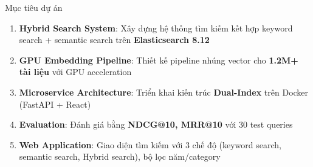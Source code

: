\begin{frame}{Mục tiêu dự án}
\begin{enumerate}
    \item \textcolor{accentTeal}{\textbf{Hybrid Search System}}: Xây dựng hệ thống tìm kiếm kết hợp keyword search + semantic search trên \textbf{Elasticsearch 8.12}

    \vspace{0.15cm}
    \item \textcolor{accentBlue}{\textbf{GPU Embedding Pipeline}}: Thiết kế pipeline nhúng vector cho \textbf{1.2M+ tài liệu} với GPU acceleration

    \vspace{0.15cm}
    \item \textcolor{accentOrange}{\textbf{Microservice Architecture}}: Triển khai kiến trúc \textbf{Dual-Index} trên Docker (FastAPI + React)

    \vspace{0.15cm}
    \item \textcolor{accentPurple}{\textbf{Evaluation}}: Đánh giá bằng \textbf{NDCG@10, MRR@10} với 30 test queries

    \vspace{0.15cm}
    \item \textcolor{accentTeal}{\textbf{Web Application}}: Giao diện tìm kiếm với 3 chế độ (keyword search, semantic search, Hybrid search), bộ lọc năm/category
\end{enumerate}
\end{frame}

